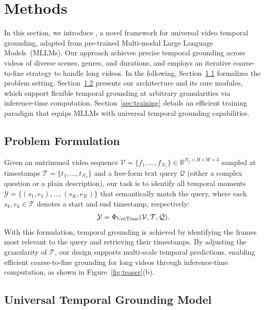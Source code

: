 \vspace{-5pt}
\section{Methods}
\label{sec:method}
\vspace{-5pt}
In this section, we introduce \textbf{\Model{}}, a novel framework for universal video temporal grounding, adapted from pre-trained Multi-modal Large Language Models~(MLLMs). Our approach achieves precise temporal grounding across videos of diverse scenes, genres, and durations, and employs an iterative coarse-to-fine strategy to handle long videos. 
In the following, Section~\ref{sec:problem} formalizes the problem setting. Section~\ref{sec:architecture} presents our architecture and its core modules, which support flexible temporal grounding at arbitrary granularities via inference-time computation. Section~\ref{sec:training} details an efficient training paradigm that equips MLLMs with universal temporal grounding capabilities.


\subsection{Problem Formulation}
\label{sec:problem}
Given an untrimmed video sequence $\mathcal{V}= \{f_1, \dots, f_{N_f}\} \in \mathbb{R}^{N_f \times H \times W \times 3}$ sampled at timestamps $\mathcal{T} = \{t_1, \dots, t_{N_f}\}$ and a free-form text query $\mathcal{Q}$ (either a complex question or a plain description), our task is to identify all temporal moments $\mathcal{Y} = \{(s_1,e_1), \dots, (s_K,e_K)\}$ that semantically match the query, 
where each $s_k, e_k \in \mathcal{T}$  denotes a start and end timestamp, respectively:
\begin{align*}
\mathcal{Y} = \Phi_{\text{{UniTime}{}}}(\mathcal{V}, \mathcal{T}, \mathcal{Q}).
\end{align*}
With this formulation, temporal grounding is achieved by identifying the frames most relevant to the query and retrieving their timestamps. 
By adjusting the granularity of $\mathcal{T}$, our design supports multi-scale temporal predictions, enabling efficient coarse-to-fine grounding for long videos through inference-time computation, as shown in Figure~\ref{fig:teaser}(b).

\subsection{Universal Temporal Grounding Model}
\label{sec:architecture}


